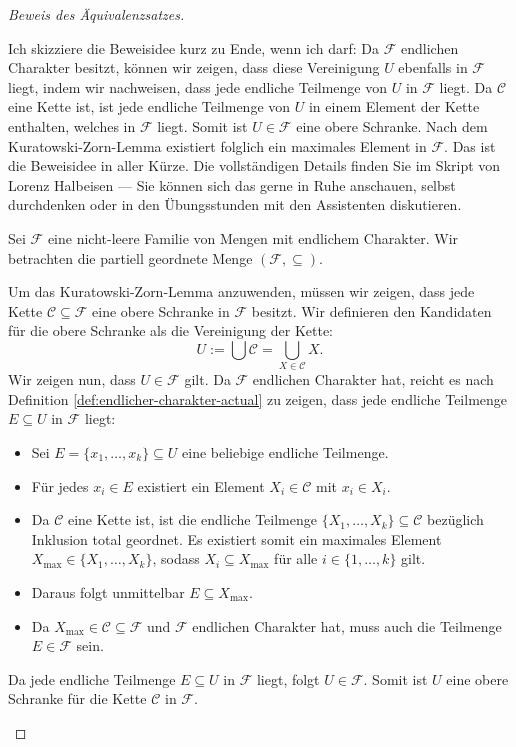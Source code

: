 \begin{proof}[Beweis des Äquivalenzsatzes]
\begin{spoken-clean}[01:24:00 - 01:26:34]
Ich skizziere die Beweisidee kurz zu Ende, wenn ich darf: Da $\mathcal{F}$ endlichen Charakter besitzt, können wir zeigen, dass diese Vereinigung $U$ ebenfalls in $\mathcal{F}$ liegt, indem wir nachweisen, dass jede endliche Teilmenge von $U$ in $\mathcal{F}$ liegt. Da $\mathcal{C}$ eine Kette ist, ist jede endliche Teilmenge von $U$ in einem Element der Kette enthalten, welches in $\mathcal{F}$ liegt. Somit ist $U \in \mathcal{F}$ eine obere Schranke. Nach dem Kuratowski-Zorn-Lemma existiert folglich ein maximales Element in $\mathcal{F}$. Das ist die Beweisidee in aller Kürze. Die vollständigen Details finden Sie im Skript von Lorenz Halbeisen --- Sie können sich das gerne in Ruhe anschauen, selbst durchdenken oder in den Übungsstunden mit den Assistenten diskutieren.
\end{spoken-clean}

\begin{math-stroke}
\begin{short-proof}
Sei $\mathcal{F}$ eine nicht-leere Familie von Mengen mit endlichem Charakter. Wir betrachten die partiell geordnete Menge $(\mathcal{F}, \subseteq)$. 

Um das Kuratowski-Zorn-Lemma anzuwenden, müssen wir zeigen, dass jede Kette $\mathcal{C} \subseteq \mathcal{F}$ eine obere Schranke in $\mathcal{F}$ besitzt. Wir definieren den Kandidaten für die obere Schranke als die Vereinigung der Kette:
\[
U := \bigcup \mathcal{C} = \bigcup_{X \in \mathcal{C}} X.
\]
Wir zeigen nun, dass $U \in \mathcal{F}$ gilt. Da $\mathcal{F}$ endlichen Charakter hat, reicht es nach Definition \ref{def:endlicher-charakter-actual} zu zeigen, dass jede endliche Teilmenge $E \subseteq U$ in $\mathcal{F}$ liegt:
\begin{itemize}
    \item Sei $E = \{x_1, \dots, x_k\} \subseteq U$ eine beliebige endliche Teilmenge.
    \item Für jedes $x_i \in E$ existiert ein Element $X_i \in \mathcal{C}$ mit $x_i \in X_i$.
    \item Da $\mathcal{C}$ eine Kette ist, ist die endliche Teilmenge $\{X_1, \dots, X_k\} \subseteq \mathcal{C}$ bezüglich Inklusion total geordnet. Es existiert somit ein maximales Element $X_{\max} \in \{X_1, \dots, X_k\}$, sodass $X_i \subseteq X_{\max}$ für alle $i \in \{1, \dots, k\}$ gilt.
    \item Daraus folgt unmittelbar $E \subseteq X_{\max}$.
    \item Da $X_{\max} \in \mathcal{C} \subseteq \mathcal{F}$ und $\mathcal{F}$ endlichen Charakter hat, muss auch die Teilmenge $E \in \mathcal{F}$ sein.
\end{itemize}
Da jede endliche Teilmenge $E \subseteq U$ in $\mathcal{F}$ liegt, folgt $U \in \mathcal{F}$. Somit ist $U$ eine obere Schranke für die Kette $\mathcal{C}$ in $\mathcal{F}$.


\end{short-proof}
\end{math-stroke}
\end{proof}
